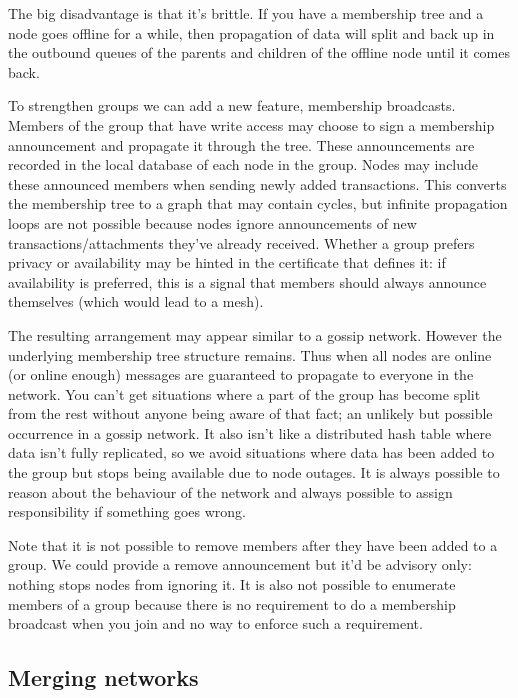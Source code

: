 \documentclass{article}
\begin{document}
The big disadvantage is that it's brittle. If you have a membership tree and a node goes offline for a while, then
propagation of data will split and back up in the outbound queues of the parents and children of the offline node
until it comes back.

To strengthen groups we can add a new feature, membership broadcasts. Members of the group that have write access
may choose to sign a membership announcement and propagate it through the tree. These announcements are recorded in
the local database of each node in the group. Nodes may include these announced members when sending newly added
transactions. This converts the membership tree to a graph that may contain cycles, but infinite propagation loops
are not possible because nodes ignore announcements of new transactions/attachments they've already received.
Whether a group prefers privacy or availability may be hinted in the certificate that defines it: if availability
is preferred, this is a signal that members should always announce themselves (which would lead to a mesh).

The resulting arrangement may appear similar to a gossip network. However the underlying membership tree structure
remains. Thus when all nodes are online (or online enough) messages are guaranteed to propagate to everyone in the
network. You can't get situations where a part of the group has become split from the rest without anyone being
aware of that fact; an unlikely but possible occurrence in a gossip network. It also isn't like a distributed hash
table where data isn't fully replicated, so we avoid situations where data has been added to the group but stops
being available due to node outages. It is always possible to reason about the behaviour of the network and always
possible to assign responsibility if something goes wrong.

Note that it is not possible to remove members after they have been added to a group. We could provide a remove
announcement but it'd be advisory only: nothing stops nodes from ignoring it. It is also not possible to enumerate
members of a group because there is no requirement to do a membership broadcast when you join and no way to enforce
such a requirement.


\subsection{Merging networks}
\end{document}
